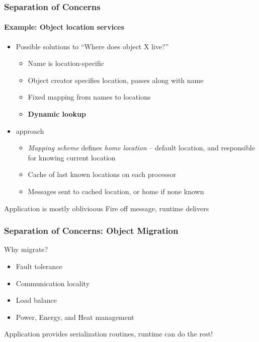 \begin{frame}[t]
\frametitle{Separation of Concerns}
\framesubtitle{Example: Object location services}
\begin{itemize}[<+->]
\item Possible solutions to ``Where does object X live?''
\begin{itemize}[<+->]
\item Name is location-specific
\item Object creator specifies location, passes along with name
\item Fixed mapping from names to locations
\item \textbf{Dynamic lookup}
\end{itemize}
\item \charm approach
\begin{itemize}
\item \emph{Mapping scheme} defines \emph{home location} -- default location, and responsible for knowing current location
\item Cache of last known locations on each processor
\item Messages sent to cached location, or home if none known
\end{itemize}
\end{itemize}
\pause
\begin{block}{Application is mostly oblivioous}
Fire off message, runtime delivers
\end{block}
\end{frame}

\begin{frame}
\frametitle{Separation of Concerns: Object Migration}
\begin{block}{Why migrate?}
\begin{itemize}
\item Fault tolerance
\item Communication locality
\item Load balance
\item Power, Energy, and Heat management
\end{itemize}
\end{block}
\pause
Application provides serialization routines, runtime can do the rest!
\end{frame}

